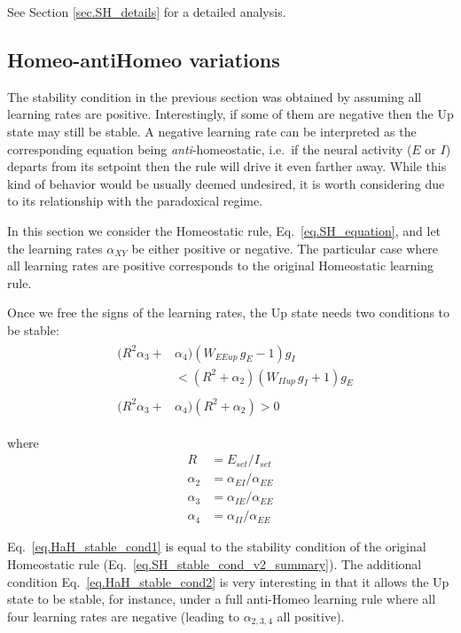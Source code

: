 \documentclass[twocolumn]{article}
\newcommand{\EE}{\mathit{EE}}
\newcommand{\EI}{\mathit{EI}}
\newcommand{\IE}{\mathit{IE}}
\newcommand{\II}{\mathit{II}}
\newcommand{\XY}{\mathit{XY}}
\newcommand{\set}{\mathit{set}}
\newcommand{\up}{\mathit{up}}
\begin{document}
See Section \ref{sec.SH_details} for a detailed analysis.



\subsection{Homeo-antiHomeo variations}

The stability condition in the previous section was obtained by assuming all learning rates are positive. Interestingly, if some of them are negative then the Up state may still be stable. A negative learning rate can be interpreted as the corresponding equation being {\em anti}-homeostatic, i.e.\ if the neural activity ($E$ or $I$) departs from its setpoint then the rule will drive it even farther away. While this kind of behavior would be usually deemed undesired, it is worth considering due to its relationship with the paradoxical regime.

In this section we consider the Homeostatic rule, Eq.\ \ref{eq.SH_equation}, and let the learning rates $\alpha_{\XY}$ be either positive or negative. The particular case where all learning rates are positive corresponds to the original Homeostatic learning rule.

Once we free the signs of the learning rates, the Up state needs two conditions to be stable:
\begin{eqnarray}
& \begin{aligned}
(R^2 \alpha_3 + & \alpha_4)(W_{\EE\up} \, g_E  - 1)g_I \\
& < (R^2 + \alpha_2)(W_{\II\up} \, g_I + 1)g_E
\end{aligned}
\label{eq.HaH_stable_cond1} \\
& \begin{aligned}
(R^2 \alpha_3 + & \alpha_4)(R^2 + \alpha_2) > 0
\end{aligned}
\label{eq.HaH_stable_cond2}
\end{eqnarray}

\noindent where
\begin{displaymath}
\begin{aligned}
R & = E_{\set}/I_{\set} \\
\alpha_2 & = \alpha_{\EI}/\alpha_{\EE} \\
\alpha_3 & = \alpha_{\IE}/\alpha_{\EE} \\
\alpha_4 & = \alpha_{\II}/\alpha_{\EE}
\end{aligned}
\end{displaymath}

\noindent Eq.\ \ref{eq.HaH_stable_cond1} is equal to the stability condition of the original Homeostatic rule (Eq.\ \ref{eq.SH_stable_cond_v2_summary}). The additional condition Eq.\ \ref{eq.HaH_stable_cond2} is very interesting in that it allows the Up state to be stable, for instance, under a full anti-Homeo learning rule where all four learning rates are negative (leading to $\alpha_{2,3,4}$ all positive).
\end{document}
